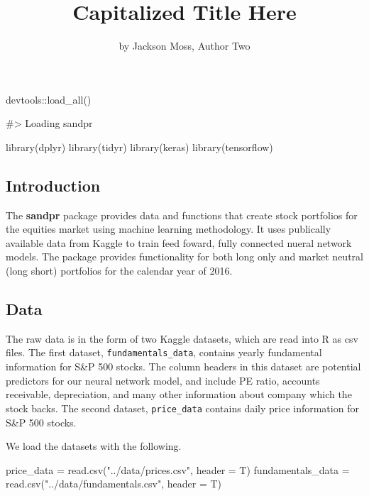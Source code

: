 \title{Capitalized Title Here}
\author{by Jackson Moss, Author Two}

\maketitle


\begin{Schunk}
\begin{Sinput}
devtools::load_all()
\end{Sinput}
\begin{Soutput}
#> Loading sandpr
\end{Soutput}
\begin{Sinput}
library(dplyr)
library(tidyr)
library(keras)
library(tensorflow)
\end{Sinput}
\end{Schunk}

\subsection{Introduction}\label{introduction}

The \textbf{sandpr} package provides data and functions that create
stock portfolios for the equities market using machine learning
methodology. It uses publically available data from Kaggle to train feed
foward, fully connected nueral network models. The package provides
functionality for both long only and market neutral (long short)
portfolios for the calendar year of 2016.

\subsection{Data}\label{data}

The raw data is in the form of two Kaggle datasets, which are read into
R as csv files. The first dataset, \texttt{fundamentals\_data}, contains
yearly fundamental information for S\&P 500 stocks. The column headers
in this dataset are potential predictors for our neural network model,
and include PE ratio, accounts receivable, depreciation, and many other
information about company which the stock backs. The second dataset,
\texttt{price\_data} contains daily price information for S\&P 500
stocks.

We load the datasets with the following.

\begin{Schunk}
\begin{Sinput}
price_data = read.csv("../data/prices.csv", header = T)
fundamentals_data = read.csv("../data/fundamentals.csv", header = T)
\end{Sinput}
\end{Schunk}


